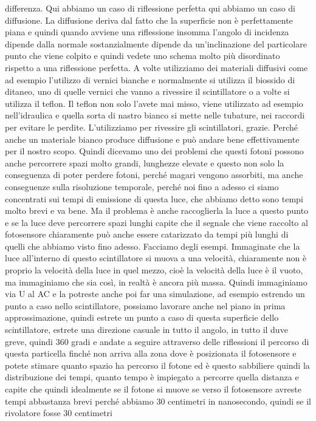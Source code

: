 differenza. Qui abbiamo un caso di riflessione perfetta qui abbiamo un caso di diffusione. La diffusione deriva dal fatto che la superficie non è perfettamente piana e quindi quando avviene una riflessione insomma l'angolo di incidenza dipende dalla normale sostanzialmente dipende da un'inclinazione del particolare punto che viene colpito e quindi vedete uno schema molto più disordinato rispetto a una riflessione perfetta. A volte utilizziamo dei materiali diffusivi come ad esempio l'utilizzo di vernici bianche e normalmente si utilizza il biossido di ditaneo, uno di quelle vernici che vanno a rivessire il scintillatore o a volte si utilizza il teflon. Il teflon non solo l'avete mai misso, viene utilizzato ad esempio nell'idraulica e quella sorta di nastro bianco si mette nelle tubature, nei raccordi per evitare le perdite. L'utilizziamo per rivessire gli scintillatori, grazie. Perché anche un materiale bianco produce diffusione e può andare bene effettivamente per il nostro scopo. Quindi dicevamo uno dei problemi che questi fotoni possono anche percorrere spazi molto grandi, lunghezze elevate e questo non solo la conseguenza di poter perdere fotoni, perché magari vengono assorbiti, ma anche conseguenze sulla risoluzione temporale, perché noi fino a adesso ci siamo concentrati sui tempi di emissione di questa luce, che abbiamo detto sono tempi molto brevi e va bene. Ma il problema è anche raccoglierla la luce a questo punto e se la luce deve percorrere spazi lunghi capite che il segnale che viene raccolto al fotosensore chiaramente può anche essere catarizzato da tempi più lunghi di quelli che abbiamo visto fino adesso. Facciamo degli esempi. Immaginate che la luce all'interno di questo scintillatore si muova a una velocità, chiaramente non è proprio la velocità della luce in quel mezzo, cioè la velocità della luce è il vuoto, ma immaginiamo che sia così, in realtà è ancora più massa. Quindi immaginiamo via U al AC e la potreste anche poi far una simulazione, ad esempio estrendo un punto a caso nello scintillatore, possiamo lavorare anche nel piano in prima approssimazione, quindi estrete un punto a caso di questa superficie dello scintillatore, estrete una direzione casuale in tutto il angolo, in tutto il duve greve, quindi 360 gradi e andate a seguire attraverso delle riflessioni il percorso di questa particella finché non arriva alla zona dove è posizionata il fotosensore e potete stimare quanto spazio ha percorso il fotone ed è questo sabbiliere quindi la distribuzione dei tempi, quanto tempo è impiegato a percorre quella distanza e capite che quindi idealmente se il fotone si muove se verso il fotosensore avreste tempi abbastanza brevi perché abbiamo 30 centimetri in nanosecondo, quindi se il rivolatore fosse 30 centimetri 


